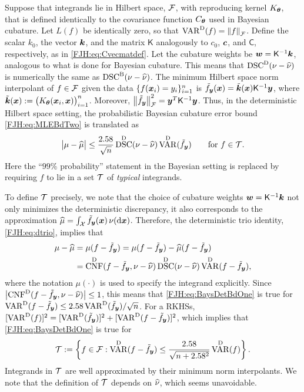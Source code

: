 \documentclass[graybox,footinfo]{svmult}
\DeclareMathOperator{\algn}{CNF}
\DeclareMathOperator{\disc}{DSC}
\DeclareMathOperator{\Var}{VAR}
\begin{document}
Suppose that integrands lie in Hilbert space,  $\mathcal{F}$, with reproducing kernel 
$K_{\boldsymbol{\theta}}$, that is defined identically to the covariance function 
$C_{\boldsymbol{\theta}}$ used in Bayesian cubature.  Let $L(f)$ be identically zero, 
so that $\Var^{\Dt}(f) = \norm{f}_{\cf}$.  Define the scalar $k_0$, the vector ${\boldsymbol{k}}$, 
and the matrix $\mathsf{K}$ analogously to $c_0$, ${\boldsymbol{c}}$, and $\mathsf{C}$, 
respectively, as in  \eqref{FJH:eq:Cvecmatdef}.  Let the cubature weights be ${\boldsymbol{w}} = 
\mathsf{K}^{-1} {\boldsymbol{k}}$, analogous to what is done for Bayesian cubature.  This means 
that $\disc^\Dt(\nu - \hnu)$ is numerically the same as $\disc^\Ba(\nu - \hnu)$.
The minimum Hilbert space norm 
interpolant of $f \in \mathcal{F}$ given the data $ \{f({\boldsymbol{x}}_i )= y_i\}_{i=1}^n$ is $\tilde{f}_{\boldsymbol{y}}({\boldsymbol{x}}) = 
\tilde{{\boldsymbol{k}}}({\boldsymbol{x}}) \mathsf{K}^{-1} {\boldsymbol{y}}$, where $\tilde{{\boldsymbol{k}}}({\boldsymbol{x}}) := 
\bigl( K_{\boldsymbol{\theta}}({\boldsymbol{x}}_i,{\boldsymbol{x}}) \bigr)_{i=1}^n$.  Moreover, $\left \lVert \tilde{f}_{\boldsymbol{y}} \right \rVert^2_{\mathcal{F}} = {\boldsymbol{y}}^T 
\mathsf{K}^{-1} {\boldsymbol{y}}$.  Thus, in the deterministic Hilbert space setting, the probabilistic 
Bayesian cubature error bound \eqref{FJH:eq:MLEBdTwo} is translated as
\begin{equation} \label{FJH:eq:BaysDetBdOne}
\abs{\mu - \hmu} \le \frac{2.58}{\sqrt{n}} \disc^{\Dt}(\nu - \hnu) \Var^{\Dt}(\tf_\bsy)  
\qquad \text{for } f\in \calT.
\end{equation}
Here the ``$99\%$ probability'' statement in the Bayesian setting is replaced by requiring 
$f$ to lie in a set ${\mathcal{T}}$ of \emph{typical} integrands. 

To define ${\mathcal{T}}$ precisely, we note that the choice of cubature weights ${\boldsymbol{w}} = 
\mathsf{K}^{-1} {\boldsymbol{k}}$ not only minimizes the deterministic discrepancy, it also 
corresponds to the approximation $\widehat{\mu}= \int_{\mathcal{X}} \tilde{f}_{\boldsymbol{y}}({\boldsymbol{x}}) \, \nu(\mathrm{d} {\boldsymbol{x}})$.  
Therefore, the deterministic trio identity, \eqref{FJH:eq:dtrio}, implies that  
\begin{align*}
\mu - \hmu & = \mu(f - \tf_\bsy) = \mu(f - \tf_\bsy) - \hmu(f - \tf_\bsy) \\
& = \algn^{\Dt}(f - 
\tf_\bsy,\nu - \hnu) \disc^\Dt(\nu - \hnu) \Var^\Dt(f - \tf_\bsy),
\end{align*}
where the notation $\mu(\cdot)$ is used to specify the integrand explicitly. Since 
$\abs{\algn^{\Dt}(f - 
	\tf_\bsy,\nu - \hnu)} \le 1$, this means that \eqref{FJH:eq:BaysDetBdOne} is true for 
	$\Var^\Dt(f - \tf_\bsy) \le 2.58 \Var^{\Dt}(\tf_\bsy) /\sqrt{n}$. For a
RKHSs, $[\Var^\Dt(f)]^2 = [\Var^\Dt(\tf_\bsy)]^2 + 
[\Var^\Dt(f - \tf_\bsy)]^2$, which implies that \eqref{FJH:eq:BaysDetBdOne} is true for 
\begin{equation*}
\calT := \left \{f \in \cf : \Var^\Dt(f - \tf_\bsy) \le \frac{2.58}{\sqrt{n + 2.58^2}} 
\Var^{\Dt}(f) 
\right\} .
\end{equation*}
Integrands in ${\mathcal{T}}$ are well approximated by their minimum norm interpolants.  We 
note that the definition of ${\mathcal{T}}$ 
depends on $\widehat{\nu}$, which seems unavoidable.
\end{document}

